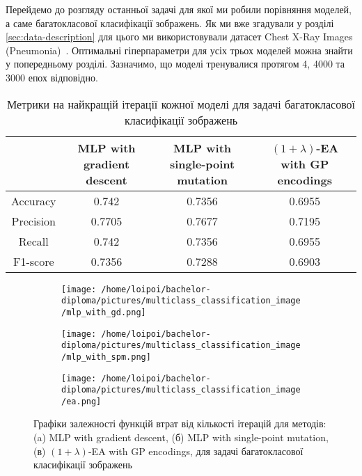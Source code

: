 Перейдемо до розгляду останньої задачі для якої ми робили порівняння моделей, а саме багатокласової класифікації зображень. Як ми вже згадували у розділі \ref{sec:data-description} для цього ми використовували датасет Chest X-Ray Images (Pneumonia)~\cite{ct32}. Оптимальні гіперпараметри для усіх трьох моделей можна знайти у попередньому розділі. Зазначимо, що моделі тренувалися протягом 4, 4000 та 3000 епох відповідно. 

\begin{table}[ht]
	\centering
	\begin{adjustbox}{max width=\textwidth}
		\begin{tabular}{|c|c|c|c|}
			\hline 
			& MLP with gradient descent & MLP with single-point mutation & $(1+\lambda)$-EA with GP encodings \\
			\hline 
			Accuracy & 0.742 & 0.7356 & 0.6955 \\
			\hline 
			Precision & 0.7705 & 0.7677 & 0.7195 \\
			\hline
			Recall & 0.742 & 0.7356 & 0.6955 \\
			\hline
			F1-score & 0.7356 & 0.7288 & 0.6903 \\
			\hline
		\end{tabular}
	\end{adjustbox}
	\caption{Метрики на найкращій ітерації кожної моделі для задачі багатокласової класифікації зображень}
	\label{metrics_mc_id_results}
\end{table}

\begin{figure}[ht]
	\centering
	\begin{subfigure}[b]{0.32\textwidth}    
		\texttt{[image: /home/loipoi/bachelor-diploma/pictures/multiclass\_classification\_image/mlp\_with\_gd.png]}
		\caption{}
	\end{subfigure}	
	\begin{subfigure}[b]{0.32\textwidth}
		\texttt{[image: /home/loipoi/bachelor-diploma/pictures/multiclass\_classification\_image/mlp\_with\_spm.png]}
		\caption{}
	\end{subfigure}	
	\begin{subfigure}[b]{0.32\textwidth}
		\texttt{[image: /home/loipoi/bachelor-diploma/pictures/multiclass\_classification\_image/ea.png]}
		\caption{}
	\end{subfigure}
	
	\caption{Графіки залежності функцій втрат від кількості ітерацій для методів: (a) MLP with gradient descent, (б) MLP with single-point mutation, (в) $(1+\lambda)$-EA with GP encodings, для задачі багатокласової класифікації зображень}
	\label{fig_losses_mc_id}
\end{figure}


